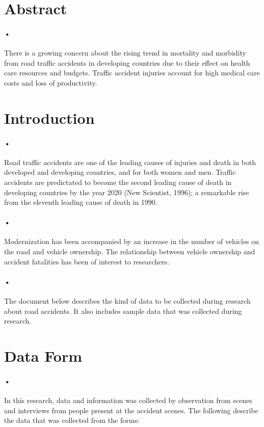\documentclass[12pt]{article}
\begin{document}
\section{Abstract}
\paragraph{•}
There is a growing concern about the rising trend in mortality and morbidity from road traffic accidents in developing countries due to their effect on health care resources and budgets. Traffic accident injuries account for high medical care costs and loss of productivity.

\section{Introduction}
\paragraph{•}
Road traffic accidents are one of the leading causes of injuries and death in both developed and developing countries, and for both women and men. Traffic accidents are predictated to become the second leading cause of death in developing countries by the year 2020 (New Scientist, 1996); a remarkable rise from the eleventh leading cause of death in 1990. 
\paragraph{•}
Modernization has been accompanied by an increase in the number of vehicles on the road and vehicle ownership. The relationship between vehicle ownership and accident fatalities has been of interest to researchers.
\paragraph{•}
The document below describes the kind of data to be collected during research about road accidents. It also includes sample data that was collected during research.

\section{Data Form}
\paragraph{•}
In this research, data and information was collected by observation from scenes and interviews from people present at the accident scenes. The following describe the data that was collected from the forms:
\end{document}
